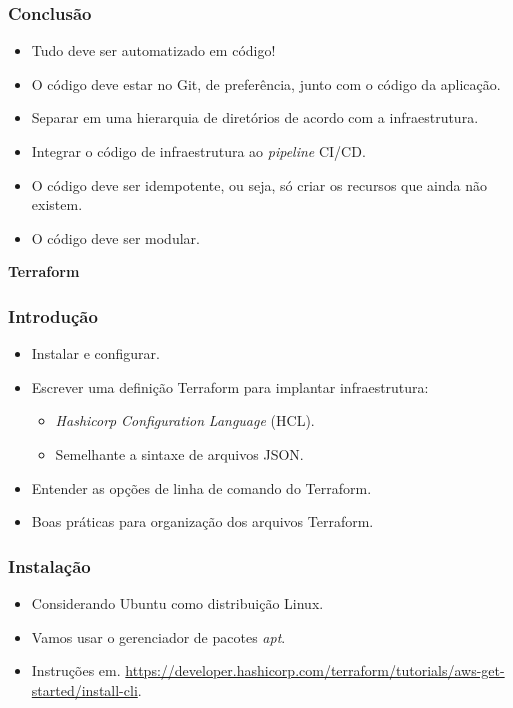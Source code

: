 \documentclass{beamer}
\begin{document}
   \begin{frame}
      \frametitle{Conclusão}
      \begin{itemize}
      \item Tudo deve ser automatizado em código!
      \item O código deve estar no Git, de preferência, junto com o código da aplicação.
      \item Separar em uma hierarquia de diretórios de acordo com a infraestrutura.
      \item Integrar o código de infraestrutura ao \textit{pipeline} CI/CD.
      \item O código deve ser idempotente, ou seja, só criar os recursos que ainda não existem.
      \item O código deve ser modular. 
      \end{itemize}
   \end{frame}

   \begin{frame}
      \centering
      \Huge \textbf{Terraform}
   \end{frame}


   \begin{frame}
      \frametitle{Introdução}
      \begin{itemize}
      \item Instalar e configurar. 
      \item Escrever uma definição Terraform para implantar infraestrutura:
      \begin{itemize}
      \item \textit{Hashicorp}\textit{ }\textit{Configuration}\textit{ }\textit{Language}\textit{ }(HCL).
      \item Semelhante a sintaxe de arquivos JSON.
      \end{itemize}
      \item Entender as opções de linha de comando do Terraform.
      \item Boas práticas para organização dos arquivos Terraform.
      \end{itemize}
   \end{frame}

   \begin{frame}
      \frametitle{Instalação}
      \begin{itemize}
      \item Considerando Ubuntu como distribuição Linux.
      \item Vamos usar o gerenciador de pacotes \textit{apt}. 
      \item Instruções em. \url{https://developer.hashicorp.com/terraform/tutorials/aws-get-started/install-cli}.
      \end{itemize}
   \end{frame}
\end{document}
